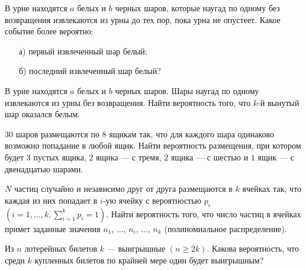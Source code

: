 \begin{problem}
В урне находятся $a$ белых и $b$ черных шаров, которые наугад по одному без возвращения извлекаются из урны до тех пор, пока урна не опустеет. 
Какое событие более вероятно: 
\begin{enumerate}
\item[а)] первый извлеченный шар белый; 
\item[б)] последний извлеченный шар белый? 
\end{enumerate}
\end{problem}



\begin{problem}
В урне находятся $a$ белых и $b$ черных шаров. Шары наугад по одному извлекаются из урны без возвращения. Найти вероятность того, 
что $k$-й вынутый шар оказался белым. 
\end{problem}


\begin{problem}
$30$ шаров размещаются по $8$ ящикам так, что для каждого шара одинаково возможно попадание в любой ящик. Найти вероятность 
размещения, при котором будет $3$ пустых ящика, $2$ ящика --- с тремя, $2$ ящика --- с шестью и $1$ ящик --- с двенадцатью шарами. 
\end{problem}


\begin{problem}
$N$ частиц случайно и независимо друг от друга размещаются в $k$ ячейках так, что каждая из них попадает 
в $i$-ую ячейку с вероятностью $p_i$ $(i=1,\ldots,k, \sum\limits_{i=1}^{k} p_i=1)$. Найти вероятность того, что число частиц в ячейках 
примет заданные значения $n_1$, $\ldots$, $n_i$, $\ldots$, $n_k$ (полиномиальное распределение). 
\end{problem}

\begin{problem}
Из $n$ лотерейных билетов $k$ --- выигрышные $(n\geqslant 2k)$. Какова вероятность, что среди $k$ купленных билетов по крайней мере 
один будет выигрышным? 
\end{problem}

\begin{comment}
\begin{problem}
Из совокупности всех подмножеств множества $\{1,2,\ldots,N\}$ по схеме выбора с возвращением выбираются множества $A$ и $B$. 
Найти вероятность, что $A$ и $B$ не пересекаются. 
\end{problem}
\end{comment}


